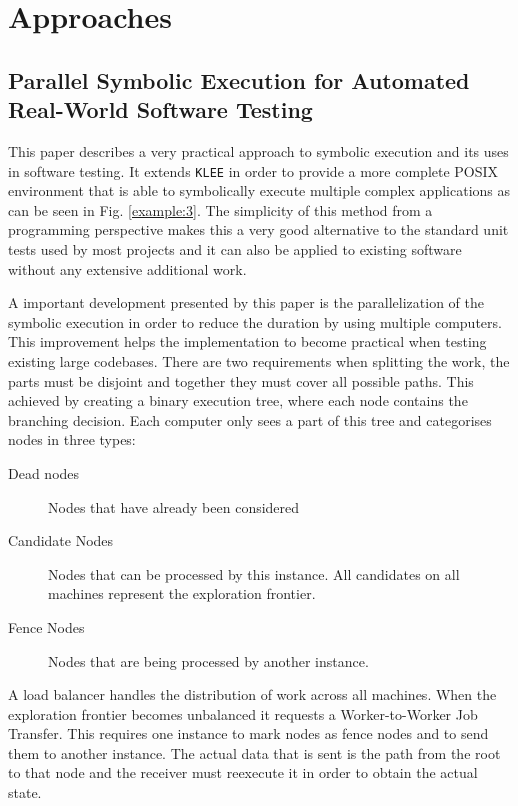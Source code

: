 \documentclass[10pt]{llncs}
\begin{document}
\section{Approaches}
\label{approaches}

\subsection{Parallel Symbolic Execution for Automated Real-World Software Testing \cite{base3}}

This paper describes a very practical approach to symbolic execution and its uses in software testing. It extends \texttt{KLEE} \cite{klee} in order to provide a more complete POSIX environment that is able to symbolically execute multiple complex applications as can be seen in Fig. \ref{example:3}. The simplicity of this method from a programming perspective makes this a very good alternative to the standard unit tests used by most projects and it can also be applied to existing software without any extensive additional work.

A important development presented by this paper is the parallelization of the symbolic execution in order to reduce the duration by using multiple computers. This improvement helps the implementation to become practical when testing existing large codebases. There are two requirements when splitting the work, the parts must be disjoint and together they must cover all possible paths. This achieved by creating a binary execution tree, where each node contains the branching decision. Each computer only sees a part of this tree and categorises nodes in three types:

\begin{description}
	\item[Dead nodes] Nodes that have already been considered
	\item[Candidate Nodes] Nodes that can be processed by this instance. All candidates on all machines represent the exploration frontier.
	\item[Fence Nodes] Nodes that are being processed by another instance.
\end{description}

A load balancer handles the distribution of work across all machines. When the exploration frontier becomes unbalanced it requests a Worker-to-Worker Job Transfer. This requires one instance to mark nodes as fence nodes and to send them to another instance. The actual data that is sent is the path from the root to that node and the receiver must reexecute it in order to obtain the actual state.
\end{document}
